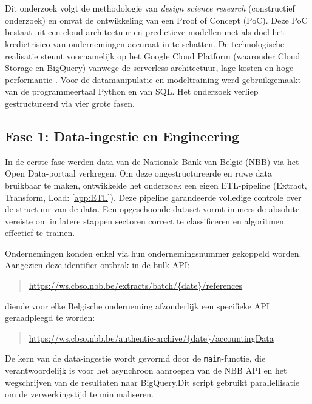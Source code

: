 
\chapter{}%
\label{ch:methodologie}

Dit onderzoek volgt de methodologie van \textit{design science research} (constructief onderzoek) en omvat de ontwikkeling van een Proof of Concept (PoC). Deze PoC bestaat uit een cloud-architectuur en predictieve modellen met als doel het kredietrisico van ondernemingen accuraat in te schatten. De technologische realisatie steunt voornamelijk op het Google Cloud Platform (waaronder Cloud Storage en BigQuery) vanwege de serverless architectuur, lage kosten en hoge performantie \autocite{GoogleCloud2024}. Voor de datamanipulatie en modeltraining werd gebruikgemaakt van de programmeertaal Python en van SQL. Het onderzoek verliep gestructureerd via vier grote fasen.



\section{Fase 1: Data-ingestie en Engineering}
In de eerste fase werden data van de Nationale Bank van België (NBB) via het Open Data-portaal verkregen. Om deze ongestructureerde en ruwe data bruikbaar te maken, ontwikkelde het onderzoek een eigen ETL-pipeline (Extract, Transform, Load: \ref{app:ETL}). Deze pipeline garandeerde volledige controle over de structuur van de data. Een opgeschoonde dataset vormt immers de absolute vereiste om in latere stappen sectoren correct te classificeren en algoritmen effectief te trainen.

Ondernemingen konden enkel via hun ondernemingsnummer gekoppeld worden. Aangezien deze identifier ontbrak in de bulk-API:
\begin{quote}
    \url{https://ws.cbso.nbb.be/extracts/batch/{date}/references}
\end{quote}
diende voor elke Belgische onderneming afzonderlijk een specifieke API geraadpleegd te worden:
\begin{quote}
    \url{https://ws.cbso.nbb.be/authentic-archive/{date}/accountingData}
\end{quote}

De kern van de data-ingestie wordt gevormd door de \texttt{main}-functie, die verantwoordelijk is voor het asynchroon aanroepen van de NBB API en het wegschrijven van de resultaten naar BigQuery.Dit script gebruikt parallellisatie om de verwerkingstijd te minimaliseren.

